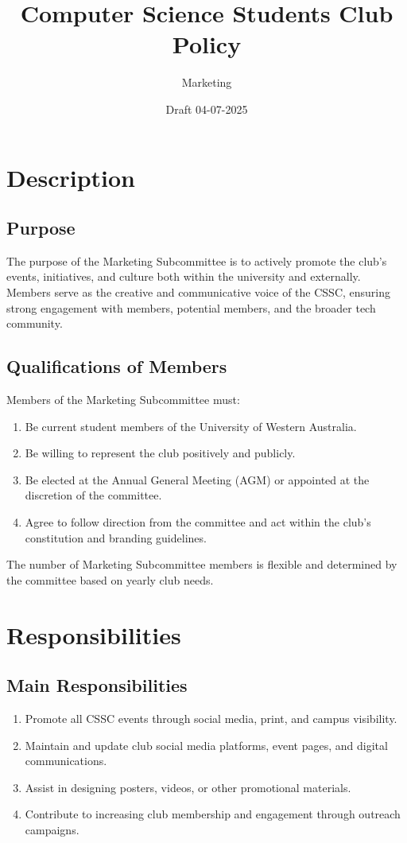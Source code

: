 \documentclass[10pt,a4paper]{report}
\title{Computer Science Students Club Policy}
\author{Marketing}
\date{Draft 04-07-2025}
\begin{document}
	\maketitle
	\newpage
	\begin{small}
		\tableofcontents
	\end{small}
	\newpage

	\chapter{Description}
		\section{Purpose}
		The purpose of the Marketing Subcommittee is to actively promote the club’s events, initiatives, and culture both within the university and externally. Members serve as the creative and communicative voice of the CSSC, ensuring strong engagement with members, potential members, and the broader tech community.

		\section{Qualifications of Members}
		Members of the Marketing Subcommittee must:
		\begin{enumerate}[label=\arabic*.]
			\item Be current student members of the University of Western Australia.
			\item Be willing to represent the club positively and publicly.
			\item Be elected at the Annual General Meeting (AGM) or appointed at the discretion of the committee.
			\item Agree to follow direction from the committee and act within the club's constitution and branding guidelines.
		\end{enumerate}

		The number of Marketing Subcommittee members is flexible and determined by the committee based on yearly club needs.

	\chapter{Responsibilities}
		\section{Main Responsibilities}
		\begin{enumerate}[label=\arabic*.]
			\item Promote all CSSC events through social media, print, and campus visibility.
			\item Maintain and update club social media platforms, event pages, and digital communications.
			\item Assist in designing posters, videos, or other promotional materials.
			\item Contribute to increasing club membership and engagement through outreach campaigns.
		\end{enumerate}
\end{document}
